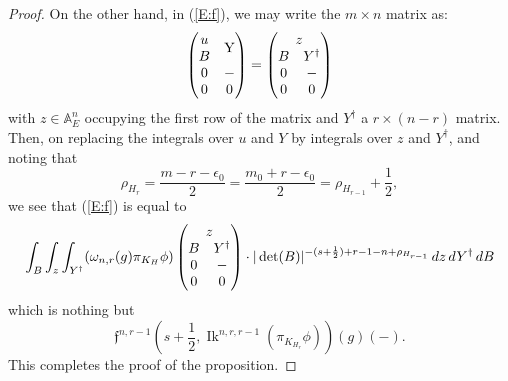 \documentclass[10pt]{amsart}
\theoremstyle{plain}
\numberwithin{equation}{section}
\begin{document}
\begin{proof}
On the other hand, in (\ref{E:f}), we may write the $m \times n$
matrix as:
\[          
\begin{pmatrix}
         u &\multirow{2}{*}{Y}\\
         B &\\
         0 & - \\
         0 & 0 
\end{pmatrix} = 
\begin{pmatrix}
\multicolumn{2}{c}{z}\\
             B & Y^{\dagger} \\
             0 & - \\
             0 & 0 \\
\end{pmatrix}
\]
with  $z \in {\mathbb{A}}_E^n$ occupying the first row of the matrix and
$Y^{\dagger}$ a $r  \times (n-r)$ matrix. Then, on replacing the
integrals over $u$ and $Y$ by  integrals over $z$ and $Y^{\dagger}$,
and noting that
\[  \rho_{H_r}  = \frac{m-r - \epsilon_0}{2} 
= \frac{m_0 + r-\epsilon_0}{2} =  \rho_{H_{r-1}} + \frac{1}{2}, 
\]
we see that (\ref{E:f}) is equal to
\[  
\int_B   \int_z \int_{Y^{\dagger}}        ( \omega_{n,r}(g) \pi_{K_H} \phi)
\begin{pmatrix}
\multicolumn{2}{c}{z}\\
             B & Y^{\dagger} \\
             0 & - \\
             0 & 0 \\
\end{pmatrix} 
\cdot |\det(B)|^{-(s+\frac{1}{2} )+ r -1 -n  +\rho_{H_{r-1}}} 
\, dz\, dY^{\dagger}\,dB
\] 
which is nothing but
 \[  
 \mathfrak{f}^{n, r-1} (s + \frac{1}{2},  
{\operatorname{Ik}}^{n,r,r-1}(\pi_{K_{H_r}}\phi))(g)(-).
\]
This completes the proof of the proposition. 
\end{proof}
 \vskip 10pt
\end{document}
